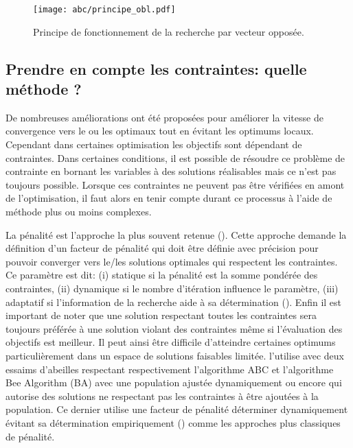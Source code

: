 \begin{figure}
    \begin{center}
        \texttt{[image: abc/principe\_obl.pdf]}
    \end{center}
    \caption{Principe de fonctionnement de la recherche par vecteur opposée.
             \label{fig:OBL_method}}
\end{figure}


\subsection{Prendre en compte les contraintes: quelle méthode ?} %
\label{sub:prendre_en_compte_les_contraintes_quelle_methode}

De nombreuses améliorations ont été proposées pour améliorer la vitesse de convergence
vers le ou les optimaux tout en évitant les optimums locaux. Cependant dans certaines
optimisation les objectifs sont dépendant de contraintes. Dans certaines conditions, il
est possible de résoudre ce problème de contrainte en bornant les variables à des solutions
réalisables mais ce n’est pas toujours possible. Lorsque ces contraintes ne peuvent pas être vérifiées
en amont de l’optimisation, il faut alors en tenir compte durant ce processus à l’aide
de méthode plus ou moins complexes.

La pénalité est l’approche la plus souvent retenue (\cite{EfrEnMezura-Montes2003}).
Cette approche demande la définition d’un facteur de pénalité qui doit être définie
avec précision pour pouvoir converger vers le/les solutions optimales qui respectent les
contraintes. Ce paramètre est dit: (i) statique si la pénalité est la somme pondérée des contraintes,
(ii) dynamique si le nombre d’itération influence le paramètre, (iii) adaptatif si l’information de la
recherche aide à sa détermination (\cite{Woldesenbet20073077}).
Enfin il est important de noter que une solution respectant toutes les contraintes sera toujours préférée
à une solution violant des contraintes même si l’évaluation des objectifs est meilleur. Il peut ainsi être
difficile d’atteindre certaines optimums particulièrement
dans un espace de solutions faisables limitée.
\cite{Tsai201480} l’utilise avec deux essaims d’abeilles respectant respectivement l’algorithme
ABC et l’algorithme Bee Algorithm (BA) avec une population ajustée dynamiquement ou encore \cite{Karaboga20113021}
qui autorise des solutions ne respectant pas les contraintes à être ajoutées à la population. Ce dernier
utilise une facteur de pénalité déterminer dynamiquement évitant sa détermination empiriquement
(\cite{Deb2000311}) comme les approches plus classiques de pénalité.
\\

